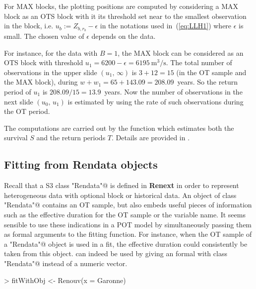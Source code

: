\documentclass[a4paper]{report}
\begin{document}
For MAX blocks, the plotting positions are computed by considering a
MAX block as an OTS block with it its threshold set near to the
smallest observation in the block, i.e. $u_b:= Z_{b,r_b} - \epsilon$
in the notations used in~(\ref{eq:LLH1}) where $\epsilon$ is
small. The chosen value of $\epsilon$ depends on the data.

For instance, for the data \verb@Garonne@ with $B=1$, the MAX block
can be considered as an OTS block with threshold 
$u_1 = 6200-\epsilon = 6195~\textrm{m}^3/\textrm{s}$.  The total number of
observations in the upper slide $(u_1, \,\infty)$ is $3 + 12 = 15$
(in the OT sample and the MAX block), during 
$w + w_1 = 65 + 143.09 = 208.09$~years. 
So the return period of $u_1$ is
$208.09/15 = 13.9$~years.
Now the number of observations in the next slide 
$(u_0,\,u_1)$ is estimated by using the rate of such observations
during the OT period.

The computations are carried out by the \verb@SandT@ function which estimates both the
survival $S$ and the return periods $T$. Details are provided in
\cite{RenCompDet}.



\subsection{Fitting from Rendata objects}

Recall that a S3 class \verb@"Rendata"@ is defined in \textbf{Renext}
in order to represent heterogeneous data with optional block or historical
data. An object of class \verb@"Rendata"@ contains an OT sample, but
also embeds useful pieces of information such as the effective
duration for the OT sample or the variable name.  It seems sensible to
use these indications in a POT model by simultaneously passing them as
formal arguments to the fitting function.  For instance, when the OT
sample of a \verb@"Rendata"@ object is used in a fit, the effective
duration could consistently be taken from this object.  \verb@Renouv@
can indeed be used by giving an \verb@x@ formal with class
\verb@"Rendata"@ instead of a numeric vector.

\begin{Schunk}
\begin{Sinput}
> fitWithObj <- Renouv(x = Garonne)
\end{Sinput}
\end{Schunk}
\end{document}
